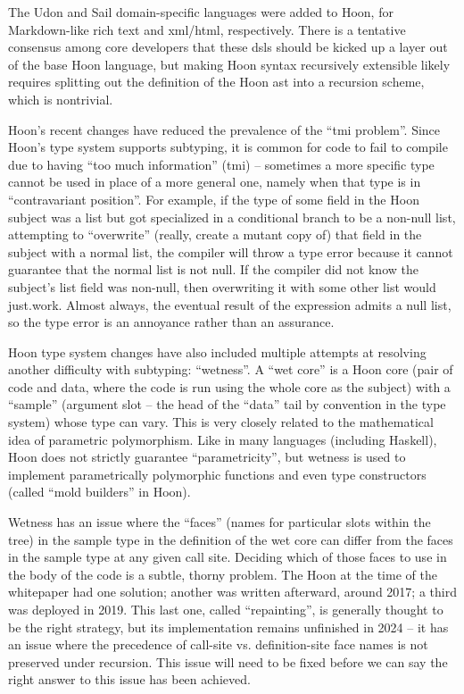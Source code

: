 \documentclass[twoside]{article}
\begin{document}
The Udon and Sail domain-specific languages were added to Hoon, for Markdown-like rich text and {\sc xml}/{\sc html}, respectively.  There is a tentative consensus among core developers that these {\sc dsl}s should be kicked up a layer out of the base Hoon language, but making Hoon syntax recursively extensible likely requires splitting out the definition of the Hoon {\sc ast} into a recursion scheme, which is nontrivial.

Hoon's recent changes have reduced the prevalence of the ``{\sc tmi} problem''.  Since Hoon's type system supports subtyping, it is common for code to fail to compile due to having ``too much information'' ({\sc tmi}) – sometimes a more specific type cannot be used in place of a more general one, namely when that type is in ``contravariant position''.  For example, if the type of some field in the Hoon subject was a list but got specialized in a conditional branch to be a non-null list, attempting to ``overwrite'' (really, create a mutant copy of) that field in the subject with a normal list, the compiler will throw a type error because it cannot guarantee that the normal list is not null.  If the compiler did not know the subject's list field was non-null, then overwriting it with some other list would just.work.  Almost always, the eventual result of the expression admits a null list, so the type error is an annoyance rather than an assurance.

Hoon type system changes have also included multiple attempts at resolving another difficulty with subtyping: ``wetness''.  A ``wet core'' is a Hoon core (pair of code and data, where the code is run using the whole core as the subject) with a ``sample'' (argument slot – the head of the ``data'' tail by convention in the type system) whose type can vary.  This is very closely related to the mathematical idea of parametric polymorphism.  Like in many languages (including Haskell), Hoon does not strictly guarantee ``parametricity'', but wetness is used to implement parametrically polymorphic functions and even type constructors (called ``mold builders'' in Hoon).

Wetness has an issue where the ``faces'' (names for particular slots within the tree) in the sample type in the definition of the wet core can differ from the faces in the sample type at any given call site.  Deciding which of those faces to use in the body of the code is a subtle, thorny problem.  The Hoon at the time of the whitepaper had one solution; another was written afterward, around 2017; a third was deployed in 2019.  This last one, called ``repainting'', is generally thought to be the right strategy, but its implementation remains unfinished in 2024 – it has an issue where the precedence of call-site vs. definition-site face names is not preserved under recursion.  This issue will need to be fixed before we can say the right answer to this issue has been achieved.
\end{document}
